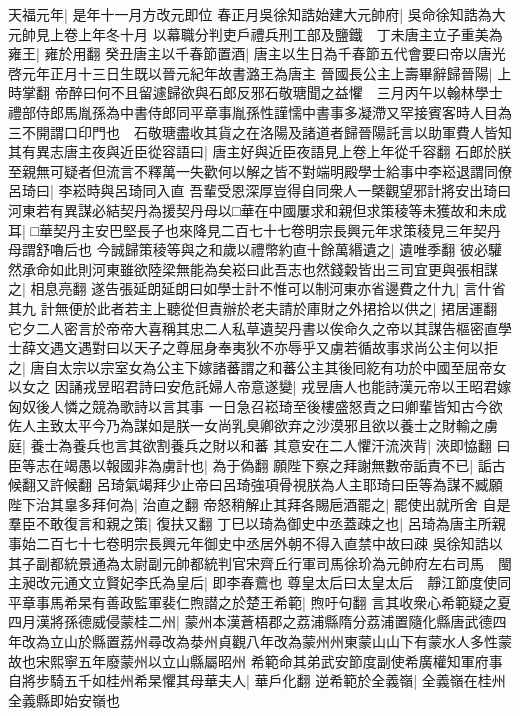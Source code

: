 天福元年|{
	是年十一月方改元即位}
春正月吳徐知誥始建大元帥府|{
	吳命徐知誥為大元帥見上卷上年冬十月}
以幕職分判吏戶禮兵刑工部及鹽鐵　丁未唐主立子重美為雍王|{
	雍於用翻}
癸丑唐主以千春節置酒|{
	唐主以生日為千春節五代會要曰帝以唐光啓元年正月十三日生既以晉元紀年故書潞王為唐主}
晉國長公主上壽畢辭歸晉陽|{
	上時掌翻}
帝醉曰何不且留遽歸欲與石郎反邪石敬瑭聞之益懼　三月丙午以翰林學士禮部侍郎馬胤孫為中書侍郎同平章事胤孫性謹懦中書事多凝滯又罕接賓客時人目為三不開謂口印門也　石敬瑭盡收其貨之在洛陽及諸道者歸晉陽託言以助軍費人皆知其有異志唐主夜與近臣從容語曰|{
	唐主好與近臣夜語見上卷上年從千容翻}
石郎於朕至親無可疑者但流言不釋萬一失歡何以解之皆不對端明殿學士給事中李崧退謂同僚呂琦曰|{
	李崧時與呂琦同入直}
吾輩受恩深厚豈得自同衆人一槩觀望邪計將安出琦曰河東若有異謀必結契丹為援契丹母以□華在中國屢求和親但求策稜等未獲故和未成耳|{
	□華契丹主安巴堅長子也來降見二百七十七卷明宗長興元年求策稜見三年契丹母謂舒嚕后也}
今誠歸策稜等與之和歲以禮幣約直十餘萬緡遺之|{
	遺唯季翻}
彼必驩然承命如此則河東雖欲陸梁無能為矣崧曰此吾志也然錢糓皆出三司宜更與張相謀之|{
	相息亮翻}
遂告張延朗延朗曰如學士計不惟可以制河東亦省邊費之什九|{
	言什省其九}
計無便於此者若主上聽從但責辦於老夫請於庫財之外捃拾以供之|{
	捃居運翻}
它夕二人密言於帝帝大喜稱其忠二人私草遺契丹書以俟命久之帝以其謀告樞密直學士薛文遇文遇對曰以天子之尊屈身奉夷狄不亦辱乎又虜若循故事求尚公主何以拒之|{
	唐自太宗以宗室女為公主下嫁諸蕃謂之和蕃公主其後囘紇有功於中國至屈帝女以女之}
因誦戎昱昭君詩曰安危託婦人帝意遂變|{
	戎昱唐人也能詩漢元帝以王昭君嫁匈奴後人憐之競為歌詩以言其事}
一日急召崧琦至後樓盛怒責之曰卿輩皆知古今欲佐人主致太平今乃為謀如是朕一女尚乳臭卿欲弃之沙漠邪且欲以養士之財輸之虜庭|{
	養士為養兵也言其欲割養兵之財以和蕃}
其意安在二人懼汗流浹背|{
	浹即恊翻}
曰臣等志在竭愚以報國非為虜計也|{
	為于偽翻}
願陛下察之拜謝無數帝詬責不已|{
	詬古候翻又許候翻}
呂琦氣竭拜少止帝曰呂琦強項骨視朕為人主耶琦曰臣等為謀不臧願陛下治其辠多拜何為|{
	治直之翻}
帝怒稍解止其拜各賜巵酒罷之|{
	罷使出就所舍}
自是羣臣不敢復言和親之策|{
	復扶又翻}
丁巳以琦為御史中丞蓋疎之也|{
	呂琦為唐主所親事始二百七十七卷明宗長興元年御史中丞居外朝不得入直禁中故曰疎}
吳徐知誥以其子副都統景通為太尉副元帥都統判官宋齊丘行軍司馬徐玠為元帥府左右司馬　閩主昶改元通文立賢妃李氏為皇后|{
	即李春鷰也}
尊皇太后曰太皇太后　靜江節度使同平章事馬希杲有善政監軍裴仁煦譛之於楚王希範|{
	煦吁句翻}
言其收衆心希範疑之夏四月漢將孫德威侵蒙桂二州|{
	蒙州本漢蒼梧郡之荔浦縣隋分荔浦置隨化縣唐武德四年改為立山於縣置荔州尋改為㳟州貞觀八年改為蒙州州東蒙山山下有蒙水人多性蒙故也宋熙寧五年廢蒙州以立山縣屬昭州}
希範命其弟武安節度副使希廣權知軍府事自將步騎五千如桂州希杲懼其母華夫人|{
	華戶化翻}
逆希範於全義嶺|{
	全義嶺在桂州全義縣即始安嶺也}
